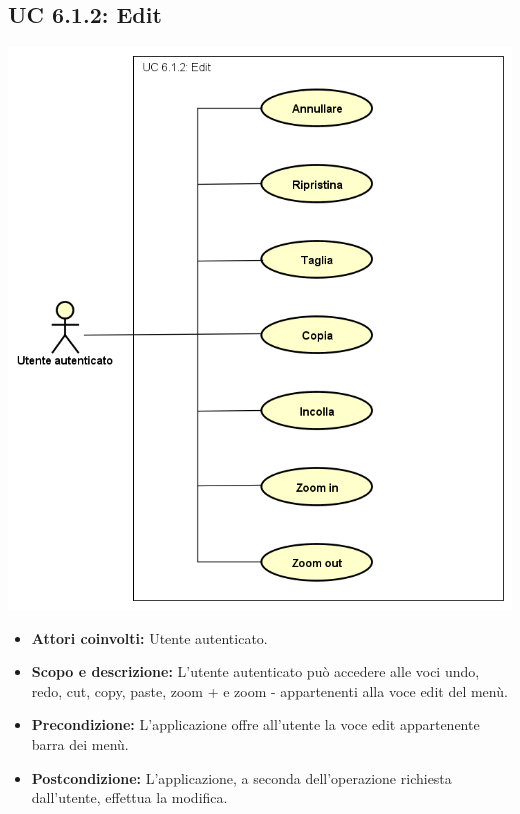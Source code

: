 \subsection{UC 6.1.2: Edit}
		\includegraphics[scale=0.7]{../../Casi D'uso/UC 6.1.2.png}
\begin{itemize}
		\item \textbf{Attori coinvolti:} Utente autenticato. \\
		\item \textbf{Scopo e descrizione:} L'utente autenticato può accedere alle voci undo, redo, cut, copy, paste, zoom + e zoom - appartenenti alla voce edit del menù. \\
		\item \textbf{Precondizione:} L'applicazione offre all'utente la voce edit appartenente barra dei menù. \\
		\item \textbf{Postcondizione:} L'applicazione, a seconda dell'operazione richiesta dall'utente, effettua la modifica. \\
\end{itemize}